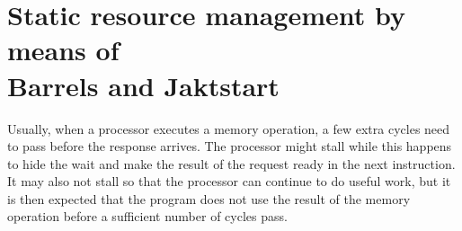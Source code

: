 \documentclass[../main/report.tex]{subfiles}
\begin{document}
\section{Static resource management by means of\\
Barrels and Jaktstart}

Usually, when a processor executes a memory operation, a few extra cycles need to pass before the response arrives.
The processor might stall while this happens to hide the wait and make the result of the request ready in the next instruction.
It may also not stall so that the processor can continue to do useful work, but it is then expected that the program does not use the result of the memory operation before a sufficient number of cycles pass.
\end{document}
